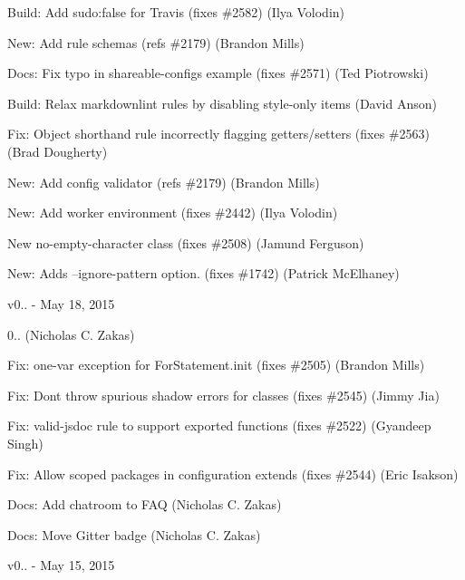 \begin{DoxyItemize}
\item Build\+: Add sudo\+:false for Travis (fixes \#2582) (Ilya Volodin)
\item New\+: Add rule schemas (refs \#2179) (Brandon Mills)
\item Docs\+: Fix typo in shareable-\/configs example (fixes \#2571) (Ted Piotrowski)
\item Build\+: Relax markdownlint rules by disabling style-\/only items (David Anson)
\item Fix\+: Object shorthand rule incorrectly flagging getters/setters (fixes \#2563) (Brad Dougherty)
\item New\+: Add config validator (refs \#2179) (Brandon Mills)
\item New\+: Add worker environment (fixes \#2442) (Ilya Volodin)
\item New no-\/empty-\/character class (fixes \#2508) (Jamund Ferguson)
\item New\+: Adds --ignore-\/pattern option. (fixes \#1742) (Patrick Mc\+Elhaney)
\end{DoxyItemize}

v0.. -\/ May 18, 2015


\begin{DoxyItemize}
\item 0.. (Nicholas C. Zakas)
\item Fix\+: one-\/var exception for For\+Statement.\+init (fixes \#2505) (Brandon Mills)
\item Fix\+: Don\textquotesingle{}t throw spurious shadow errors for classes (fixes \#2545) (Jimmy Jia)
\item Fix\+: valid-\/jsdoc rule to support exported functions (fixes \#2522) (Gyandeep Singh)
\item Fix\+: Allow scoped packages in configuration extends (fixes \#2544) (Eric Isakson)
\item Docs\+: Add chatroom to F\+AQ (Nicholas C. Zakas)
\item Docs\+: Move Gitter badge (Nicholas C. Zakas)
\end{DoxyItemize}

v0.. -\/ May 15, 2015



